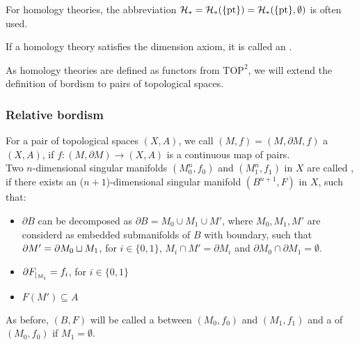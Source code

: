 \documentclass[a4paper,11pt]{article}
\begin{document}
\begin{definition}
\begin{itemize}
    \end{itemize}
    For homology theories, the abbreviation \(\mathcal{H}_\ast=\mathcal{H}_\ast(\{\mathrm{pt}\})=\mathcal{H}_\ast(\{\mathrm{pt}\},\emptyset)\) is often used.
\end{definition}

\begin{remark}
    If a homology theory satisfies the dimension axiom, it is called an .
\end{remark}

As homology theories are defined as functors from \(\mathrm{TOP}^2\), we will extend the definition of bordism to pairs of topological spaces.

\subsubsection{Relative bordism}

\begin{definition}
    For a pair of topological spaces \((X,A)\), we call \((M,f)=(M,\partial M,f)\) a \((X,A)\), if \(f:(M,\partial M)\to (X,A)\) is a continuous map of pairs.\\
    Two \(n\)-dimensional singular manifolds \((M^n_0,f_0)\) and \((M^n_1,f_1)\) in \(X\) are called , if there exists an (\(n+1\))-dimensional singular manifold \((B^{n+1},F)\) in \(X\), such that:
    \begin{itemize}
        \item \(\partial B\) can be decomposed as  \(\partial B=M_0\cup M_1\cup M'\), where \(M_0,M_1,M'\) are considerd as embedded submanifolds of \(B\) with boundary, such that 
        \(\partial M'=\partial M_0\sqcup M_1\), 
        for \(i\in\{0,1\}\), \(M_i\cap M'=\partial M_i\) and \(\partial M_0
        \cap\partial M_1=\emptyset\).

        \item \(\partial F_{|_{M_i}}=f_i\), for \(i\in\{0,1\}\)

        \item \(F(M')\subseteq A\)
    \end{itemize}
    As before, \((B,F)\) will be called a  between \((M_0,f_0)\) and \((M_1,f_1)\) and a  of \((M_0,f_0)\) if \(M_1=\emptyset\).
\end{definition}
\end{document}
